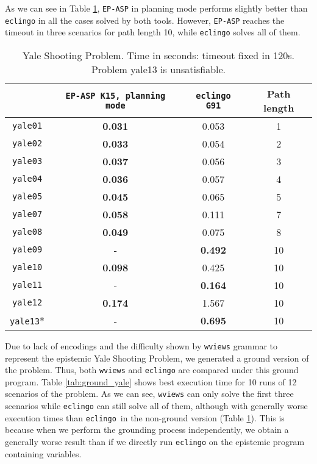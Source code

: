 \documentclass{new_tlp}
\def\eclingo{{\tt eclingo}}
\def\\wviews{{\tt \wviews}}
\def\wviews{{\tt wviews}}
\def\EPASP{{\tt EP-ASP}}
\begin{document}
As we can see in Table \ref{tab:yale}, \EPASP{} in planning mode performs slightly better than \eclingo{} in all the cases solved by both tools. However, \EPASP{} reaches the timeout in three scenarios for path length 10, while \eclingo{} solves all of them.
\begin{table}[ht]
    \begin{tabular}{c|cc|c}
    \hline
           & \texttt{\EPASP{} K15, planning mode} & \texttt{eclingo G91} & Path length \\ \hline
    \texttt{yale01} & {\bf 0.031}      & 0.053       & 1       \\
    \texttt{yale02} & {\bf 0.033}      & 0.054       & 2       \\
    \texttt{yale03} & {\bf 0.037}      & 0.056       & 3       \\
    \texttt{yale04} & {\bf 0.036}      & 0.057       & 4       \\
    \texttt{yale05} & {\bf 0.045}      & 0.065       & 5       \\
    \texttt{yale07} & {\bf 0.058}      & 0.111       & 7       \\
    \texttt{yale08} & {\bf 0.049}      & 0.075       & 8       \\
    \texttt{yale09} & -          & {\bf 0.492}       & 10      \\
    \texttt{yale10} & {\bf 0.098}      & 0.425       & 10      \\
    \texttt{yale11} & -          & {\bf 0.164}       & 10      \\
    \texttt{yale12} & {\bf 0.174}      & 1.567       & 10      \\
    \texttt{yale13}* & -         & {\bf 0.695}      & 10      \\ \hline
    \end{tabular}
\caption{Yale Shooting Problem. Time in seconds: timeout fixed in 120s. Problem yale13 is unsatisfiable.}
\label{tab:yale}
\end{table}

Due to lack of encodings and the difficulty shown by \wviews{} grammar to represent the epistemic Yale Shooting Problem, we generated a ground version of the problem. Thus, both \wviews{} and \eclingo{} are compared under this ground program. Table \ref{tab:ground_yale} shows best execution time for 10 runs of 12 scenarios of the problem. As we can see, \wviews{} can only solve the first three scenarios while \eclingo{} can still solve all of them, although with generally worse execution times than \eclingo{} in the non-ground version (Table \ref{tab:yale}).
This is because when we perform the grounding process independently, we obtain a generally worse result than if we directly run \eclingo{} on the epistemic program containing variables.
\end{document}
